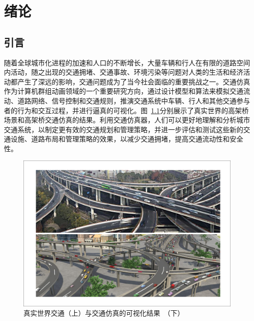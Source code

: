 
\chapter{绪论}

\section{引言}

随着全球城市化进程的加速和人口的不断增长，大量车辆和行人在有限的道路空间内活动，随之出现的交通拥堵、交通事故、环境污染等问题对人类的生活和经济活动都产生了深远的影响，交通问题成为了当今社会面临的重要挑战之一。交通仿真作为计算机群组动画领域的一个重要研究方向，通过设计模型和算法来模拟交通流动、道路网络、信号控制和交通规则，推演交通系统中车辆、行人和其他交通参与者的行为和交互过程，并进行逼真的可视化。图~\ref{fig:intro_example}分别展示了真实世界的高架桥场景和高架桥交通仿真的结果。利用交通仿真器，人们可以更好地理解和分析城市交通系统，以制定更有效的交通规划和管理策略，并进一步评估和测试这些新的交通设施、道路布局和管理策略的效果，以减少交通拥堵，提高交通流动性和安全性。

\begin{figure}[!tbh]
\centering
\includegraphics[width=\textwidth]{figure/intro/example.pdf}
\caption[真实世界交通与交通仿真的可视化结果]{
真实世界交通（上）与交通仿真的可视化结果~\cite{chao2017realistic}（下）
}

\label{fig:intro_example}
\end{figure}

